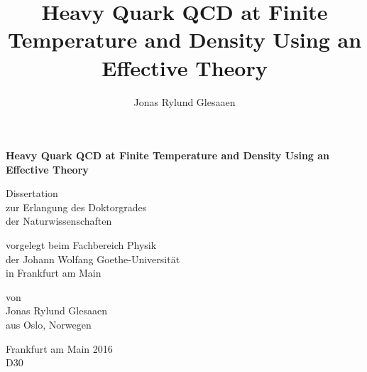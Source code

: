 \documentclass[%
  12pt,%
  twoside,%
  openright,%
  cleardoublepage=empty%
]{scrreprt}
\author{Jonas Rylund Glesaaen}
\title{Heavy Quark QCD at Finite Temperature and Density Using an Effective Theory}
\begin{document}
\begin{titlepage}

  \vspace*{\fill}

  \begin{center} \sffamily\Huge\bfseries
    Heavy Quark QCD at Finite Temperature and Density Using an Effective Theory
  \end{center}

  \vspace*{1cm}

  \begin{center} \sffamily\large
    Dissertation\\
    zur Erlangung des Doktorgrades\\
    der Naturwissenschaften
  \end{center}

  \vspace*{1cm}

  \begin{center} \sffamily\large
    vorgelegt beim Fachbereich Physik\\
    der Johann Wolfang Goethe-Universit\"at\\
    in Frankfurt am Main
  \end{center}

  \vspace*{1cm}

  \begin{center} \sffamily\large
    von\\
    Jonas Rylund Glesaaen\\
    aus Oslo, Norwegen
  \end{center}

  \vspace*{1cm}

  \begin{center} \sffamily\large
    Frankfurt am Main 2016\\
    D30
  \end{center}

  \vspace*{\fill}

  
\end{titlepage}

\cleardoublepage
{}
\tableofcontents

\cleardoublepage
{}


\cleardoublepage
{}

\end{document}
